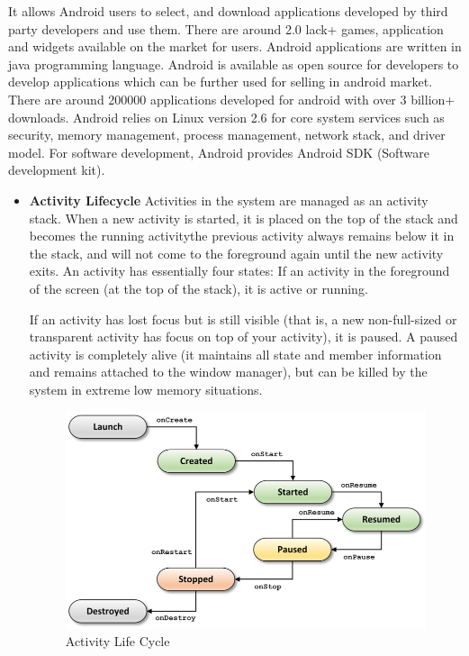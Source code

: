  It allows Android users to select, and
download applications developed by third party developers and use them. There
are around 2.0 lack+ games, application and widgets available on the market for
users. Android applications are written in java programming language. Android is
available as open source for developers to develop applications which can be
further used for selling in android market. There are around 200000 applications
developed for android with over 3 billion+ downloads. Android relies on Linux version 2.6 for core system services such as security, memory management, process management, network stack, and driver model. For software development, Android provides Android SDK (Software development kit).

\begin{itemize}

\item \textbf{Activity Lifecycle}
Activities in the system are managed as an activity stack. When a new activity
is started, it is placed on the top of the stack and becomes the running activitythe previous activity always remains below it in the stack, and will not come to
the foreground again until the new activity exits. An activity has essentially four
states:
If an activity in the foreground of the screen (at the top of the stack), it is
active or running.

If an activity has lost focus but is still visible (that is, a new non-full-sized or
transparent activity has focus on top of your activity), it is paused. A paused
activity is completely alive (it maintains all state and member information and
remains attached to the window manager), but can be killed by the system in
extreme low memory situations.
\begin{figure}[ht]
\centering
\includegraphics[scale=0.5]{images/a2.png}
\caption{Activity Life Cycle}
\label{fig: Activity }
\end{figure}


\end{itemize}
